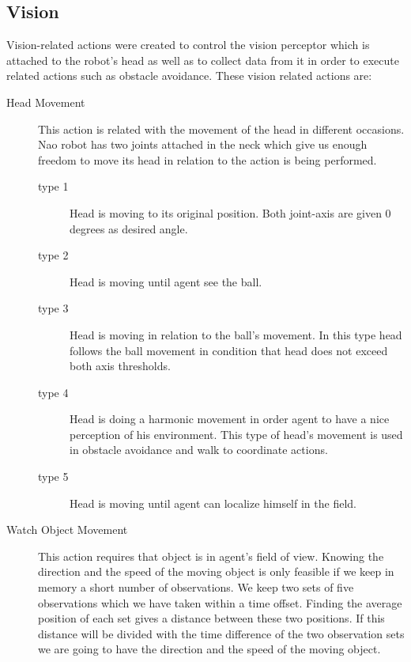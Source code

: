 \subsection{Vision}
Vision-related actions were created to control the vision perceptor which is attached to the robot's head as well as to collect data from it in order to execute related actions such as obstacle avoidance. These vision related actions are:
\begin{description}
 \item[Head Movement] This action is related with the movement of the head in different occasions. Nao robot has two joints attached in the neck which give us enough freedom to move its head in relation to the action is being performed.
 \begin{description}
 
 \item[type 1] Head is moving to its original position. Both joint-axis are given $0$ degrees as desired angle.
 
 \item[type 2] Head is moving until agent see the ball.
 
 \item[type 3] Head is moving in relation to the ball's movement. In this type head follows the ball movement in condition that head does not exceed both axis thresholds.
 
 \item[type 4] Head is doing a harmonic movement in order agent to have a nice perception of his environment. This type of head's movement is used in obstacle avoidance and walk to coordinate actions.
 
 \item[type 5] Head is moving until agent can localize himself in the field.
 
 \end{description}
 
 \item[Watch Object Movement] This action requires that object is in agent's field of view. Knowing the direction and the speed of the moving object is only feasible if we keep in memory a short number of observations. We keep two sets of five observations which we have taken within a time offset. Finding the average position of each set gives a distance between these two positions. If this distance will be divided with the time difference of the two observation sets we are going to have the direction and the speed of the moving object.
 

\end{description}
